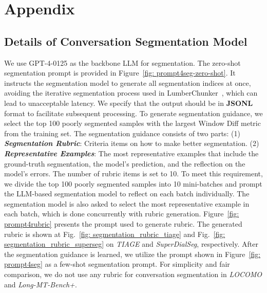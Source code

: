 \section{Appendix}

\subsection{Details of Conversation Segmentation Model}
\label{sec: segmentation_details}

We use GPT-4-0125 as the backbone LLM for segmentation. The zero-shot segmentation prompt is provided in Figure~\ref{fig: prompt4seg-zero-shot}. It instructs the segmentation model to generate all segmentation indices at once, avoiding the iterative segmentation process used in LumberChunker~\citep{duarte2024lumberchunker}, which can lead to unacceptable latency. We specify that the output should be in \textbf{JSONL} format to facilitate subsequent processing.
To generate segmentation guidance, we select the top 100 poorly segmented samples with the largest Window Diff metric from the training set. The segmentation guidance consists of two parts: (1) \textit{\textbf{Segmentation Rubric}}: Criteria items on how to make better segmentation. (2) \textit{\textbf{Representative Examples}}: The most representative examples that include the ground-truth segmentation, the model's prediction, and the reflection on the model's errors.
The number of rubric items is set to 10. To meet this requirement, we divide the top 100 poorly segmented samples into 10 mini-batches and prompt the LLM-based segmentation model to reflect on each batch individually. The segmentation model is also asked to select the most representative example in each batch, which is done concurrently with rubric generation. Figure~\ref{fig: prompt4rubric} presents the prompt used to generate rubric. The generated rubric is shown at Fig.~\ref{fig: segmentation_rubric_tiage} and Fig.~\ref{fig: segmentation_rubric_superseg} on \textit{TIAGE} and \textit{SuperDialSeg}, respectively. After the segmentation guidance is learned, we utilize the prompt shown in Figure~\ref{fig: prompt4seg} as a few-shot segmentation prompt. For simplicity and fair comparison, we do not use any rubric for conversation segmentation in \textit{LOCOMO} and \textit{Long-MT-Bench+}.







